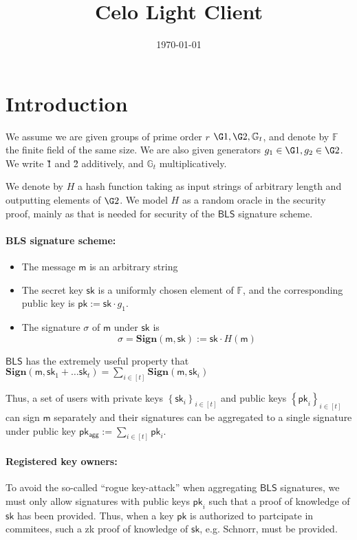 \documentclass[11pt]{article}
\title{%
Celo Light Client}
\date{\today}
\date{}
\numberwithin{figure}{section} %
\newcommand{\set}[1]{\ensuremath{\left\{#1\right\}}\xspace}
\newcommand{\Gt}{\ensuremath{{\mathbb G}_t}\xspace}
\newcommand{\F}{\ensuremath{\mathbb F}\xspace}
\newcommand{\defeq}{:=}
\newcommand{\sett}[2]{\ensuremath{\set{#1}_{#2}}\xspace}
\newcommand{\sk}{\ensuremath{\mathsf{sk}}\xspace}
\newcommand{\msg}{\ensuremath{\mathsf{m}}\xspace}
\newcommand{\pk}{\ensuremath{\mathsf{pk}}\xspace}
\newcommand{\pkagg}{\ensuremath{\mathsf{pk_{agg}}}\xspace}
\newcommand{\sign}{\ensuremath{\mathbf{Sign}}\xspace}
\newcommand{\bls}{\ensuremath{\mathsf{BLS}}\xspace}
\newcommand{\sig}{\ensuremath{\sigma}\xspace}
\begin{document}
\maketitle


\section{Introduction}
We assume we are given groups of prime order $r$ $\G1,\G2,\Gt$,
and denote by \F the finite field of the same size.
We are also given generators $g_1\in \G1, g_2\in \G2$.
We write \G1 and \G2 additively, and \Gt multiplicatively.

We denote by $H$ a hash function taking as input strings of arbitrary length
and outputting elements of $\G2$.
We model $H$ as a random oracle in the security proof, mainly as that is needed for security of the \bls signature scheme.
\paragraph{BLS signature scheme:}
\begin{itemize}
\item The message \msg is an arbitrary string 
\item The secret key \sk is a uniformly chosen element of \F, and the corresponding public key is $\pk \defeq \sk\cdot g_1$.
\item The signature \sig of \msg under \sk is 
\[\sig = \sign(\msg,\sk) \defeq  \sk\cdot H(\msg)\]
\end{itemize}

\bls has the extremely useful property that $\sign(\msg,\sk_1+\ldots \sk_t) = 
\sum_{i\in [t]} \sign(\msg,\sk_i)$

Thus, a set of users with private keys \sett{\sk_i}{i\in [t]}
and public keys \sett{\pk_i}{i\in [t]}
can sign \msg separately and their signatures can be aggregated to a single signature under public key $\pkagg \defeq \sum_{i\in [t]} \pk_i$.

\paragraph{Registered key owners:}

To avoid the so-called ``rogue key-attack'' when aggregating \bls signatures, we must only allow signatures with public keys $\pk_i$ such that a proof of knowledge of \sk has been provided.
Thus, when a key \pk is authorized to partcipate in commitees, such a zk proof of knowledge of \sk, e.g. Schnorr, must be provided.
\end{document}

